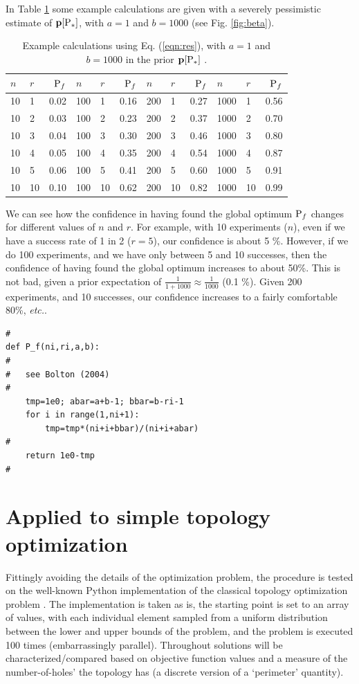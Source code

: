 \documentclass[11pt]{article}
\begin{document}
In Table \ref{tab:exp} some example calculations are given with a severely pessimistic estimate of $\p[\P_\ast]$, with $a=1$ and $b=1000$ (see Fig. \ref{fig:beta}). 
\begin{table}
\centering
\caption{\label{tab:exp}Example calculations using Eq. (\ref{eqn:res}), with $a=1$ and $b=1000$ in the prior $\p[\P_\ast]$ . }
\begin{tabular}{ll|r|ll|r|ll|r|ll|r|}
$n$  & $r$  & $\P_f$  & $n$   & $r$  & $\P_f$  & $n$    & $r$  & $\P_f$ & $n$    & $r$  & $\P_f$  \\
\hline
10 & 1  & 0.02  & 100 & 1  & 0.16 &  200 & 1  & 0.27  &  1000 & 1  & 0.56\\
10 & 2  & 0.03  & 100 & 2  & 0.23 &  200 & 2  & 0.37 &  1000 & 2  & 0.70 \\
10 & 3  & 0.04 & 100 & 3  & 0.30 &  200 & 3  & 0.46  &  1000 & 3  & 0.80\\
10 & 4  & 0.05  & 100 & 4  & 0.35 &  200 & 4  & 0.54 &  1000 & 4  & 0.87 \\
10 & 5  & 0.06  & 100 & 5  & 0.41 &  200 & 5  & 0.60  &  1000 & 5  & 0.91 \\
10 & 10 & 0.10 & 100 & 10 & 0.62 &  200 & 10 & 0.82 &  1000 & 10 & 0.99
\end{tabular}
\end{table}


We can see how the confidence in having found the global optimum $\P_f$ changes for different values of $n$ and $r$. For example, with 10 experiments ($n$), even if we have a success rate of 1 in 2 ($r=5$), our confidence is about 5 \%.  However, if we do 100 experiments, and we have only between 5 and 10 successes, then the confidence of having found the global optimum increases to about 50\%. This is not bad, given a prior expectation of $\frac{1}{1 + 1000} \approx \frac{1}{1000}$ (0.1 \%). Given 200 experiments, and 10 successes, our confidence increases to a fairly comfortable 80\%, \emph{etc.}.

\begin{minipage}{\linewidth}
\begin{verbatim}
#
def P_f(ni,ri,a,b):
#
#   see Bolton (2004)
#
    tmp=1e0; abar=a+b-1; bbar=b-ri-1
    for i in range(1,ni+1):
        tmp=tmp*(ni+i+bbar)/(ni+i+abar)
#
    return 1e0-tmp
#
\end{verbatim}
\end{minipage}

\section{Applied to simple topology optimization}
Fittingly avoiding the details of the optimization problem, the procedure is tested on the well-known Python implementation of the classical topology optimization problem \cite{sigmund2001m}. The implementation is taken as is, the starting point is set to an array of values, with each individual element sampled from a uniform distribution between the lower and upper bounds of the problem, and the problem is executed 100 times (embarrassingly parallel). Throughout solutions will be characterized/compared based on objective function values and a measure of the number-of-holes' the topology has (a discrete version of a `perimeter' quantity).
\end{document}
